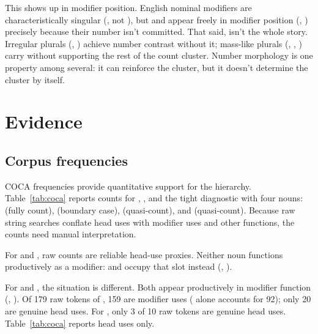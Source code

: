 \documentclass[12pt,a4paper]{article}
\begin{document}
This shows up in modifier position. English nominal modifiers are characteristically singular (, not ), but  and  appear freely in modifier position (, ) precisely because their number isn't committed. That said,  isn't the whole story. Irregular plurals (, ) achieve number contrast without it; mass-like plurals (, , ) carry  without supporting the rest of the count cluster. Number morphology is one property among several: it can reinforce the cluster, but it doesn't determine the cluster by itself.

\section{Evidence}\label{sec:evidence}

\subsection{Corpus frequencies}\label{sec:corpus}

COCA frequencies \citep{davies2020coca} provide quantitative support for the hierarchy. Table~\ref{tab:coca} reports counts for , , and the tight diagnostic  with four nouns:  (fully count),  (boundary case),  (quasi-count), and  (quasi-count). Because raw string searches conflate head uses with modifier uses and other functions, the counts need manual interpretation.



For  and , raw counts are reliable head-use proxies. Neither noun functions productively as a modifier:  and  occupy that slot instead (, ).

For  and , the situation is different. Both appear productively in modifier function (, ). Of 179 raw tokens of , 159 are modifier uses ( alone accounts for 92); only 20 are genuine head uses. For , only 3 of 10 raw  tokens are genuine head uses. Table~\ref{tab:coca} reports head uses only.
\end{document}
